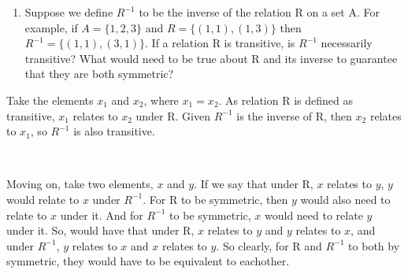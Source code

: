 \documentclass{article}
\begin{document}
\begin{enumerate}[resume]
    \item Suppose we define $R^{-1}$ to be the inverse of the relation R on a set A. For example, if $A = \{1, 2, 3\}$ and $R = \{(1, 1), (1, 3)\}$ then $R^{-1} = \{(1, 1), (3, 1)\}$. If a relation R is transitive, is $R^{-1}$ necessarily transitive? What would need to be true about R and its inverse to guarantee that they are both symmetric?
\end{enumerate}

Take the elements $x_1$ and $x_2$, where $x_1 = x_2$. As relation R is defined as transitive, $x_1$ relates to $x_2$ under R. Given $R^{-1}$ is the inverse of R, then $x_2$ relates to $x_1$, so $R^{-1}$ is also transitive.

\,

Moving on, take two elements, $x$ and $y$. If we say that under R, $x$ relates to $y$, $y$ would relate to $x$ under $R^{-1}$. For R to be symmetric, then $y$ would also need to relate to $x$ under it. And for $R^{-1}$ to be symmetric, $x$ would need to relate $y$ under it. So, would have that under R, $x$ relates to $y$ and $y$ relates to $x$, and under $R^{-1}$, $y$ relates to $x$ and $x$ relates to $y$. So clearly, for R and $R^{-1}$ to both by symmetric, they would have to be equivalent to eachother.
\end{document}
